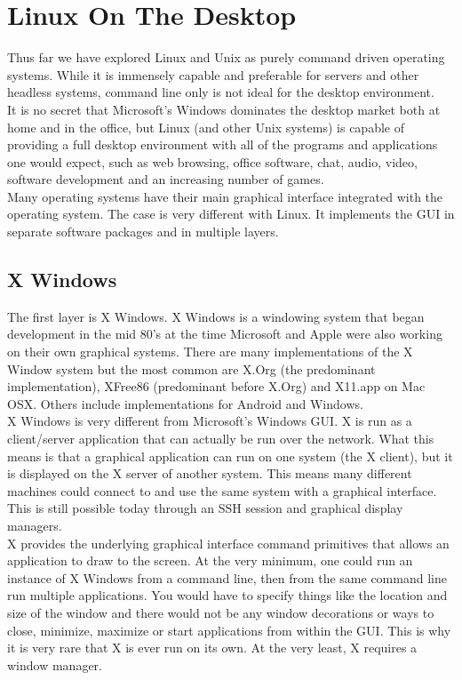 \chapter{Linux On The Desktop}

Thus far we have explored Linux and Unix as purely command driven operating systems.  While it is immensely capable and preferable for servers and other headless systems, command line only is not ideal for the desktop environment.\\

It is no secret that Microsoft's Windows dominates the desktop market both at home and in the office, but Linux (and other Unix systems) is capable of providing a full desktop environment with all of the programs and applications one would expect, such as web browsing, office software, chat, audio, video, software development and an increasing number of games.\\

Many operating systems have their main graphical interface integrated with the operating system.  The case is very different with Linux.  It implements the GUI in separate software packages and in multiple layers.

\section{X Windows}

The first layer is X Windows.  X Windows is a windowing system that began development in the mid 80's at the time Microsoft and Apple were also working on their own graphical systems.  There are many implementations of the X Window system but the most common are X.Org (the predominant implementation), XFree86 (predominant before X.Org) and X11.app on Mac OSX.  Others include implementations for Android and Windows.\\

X Windows is very different from Microsoft's Windows GUI.  X is run as a client/server application that can actually be run over the network.  What this means is that a graphical application can run on one system (the X client), but it is displayed on the X server of another system.  This means many different machines could connect to and use the same system with a graphical interface.  This is still possible today through an SSH session and graphical display managers.\\

X provides the underlying graphical interface command primitives that allows an application to draw to the screen.  At the very minimum, one could run an instance of X Windows from a command line, then from the same command line run multiple applications.  You would have to specify things like the location and size of the window and there would not be any window decorations or ways to close, minimize, maximize or start applications from within the GUI.  This is why it is very rare that X is ever run on its own.  At the very least, X requires a window manager.

